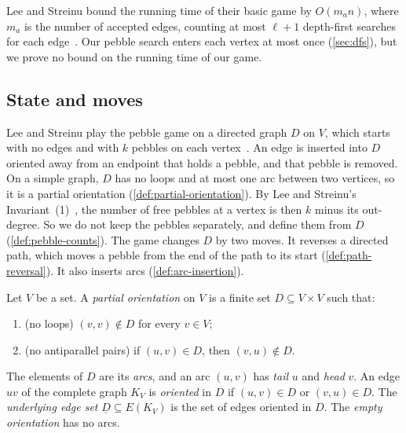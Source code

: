 Lee and Streinu bound the running time of their basic game by
$O(m_a n)$, where $m_a$ is the number of accepted edges, counting at
most $\ell + 1$ depth-first searches for each
edge~\cite[p.~1430]{leeStreinu2008}. Our pebble search enters each
vertex at most once (\cref{sec:dfs}), but we prove no bound on the
running time of our game.

\subsection{State and moves}
\label{sec:pebble-game-state}

Lee and Streinu play the pebble game on a directed graph $D$ on $V$,
which starts with no edges and with $k$ pebbles on each
vertex~\cite[\S 3]{leeStreinu2008}. An edge is inserted into $D$
oriented away from an endpoint that holds a pebble, and that pebble is
removed. On a simple graph, $D$ has no loops and at most one arc
between two vertices, so it is a partial orientation
(\cref{def:partial-orientation}). By Lee and Streinu's
Invariant~(1)~\cite[Lemma~10]{leeStreinu2008}, the number of free
pebbles at a vertex is then $k$ minus its out-degree. So we do not keep
the pebbles separately, and define them from $D$
(\cref{def:pebble-counts}). The game changes $D$ by two moves. It
reverses a directed path, which moves a pebble from the end of the
path to its start (\cref{def:path-reversal}). It also inserts arcs
(\cref{def:arc-insertion}).

\begin{definition}
  \label{def:partial-orientation}
  \leanok
  Let $V$ be a set. A \emph{partial orientation} on $V$ is a finite set
  $D \subseteq V \times V$ such that:
  \begin{enumerate}
    \item (no loops) $(v, v) \notin D$ for every $v \in V$;
    \item (no antiparallel pairs) if $(u, v) \in D$, then
      $(v, u) \notin D$.
  \end{enumerate}
  The elements of $D$ are its \emph{arcs}, and an arc $(u, v)$ has
  \emph{tail} $u$ and \emph{head} $v$. An edge $uv$ of the complete
  graph $K_V$ is \emph{oriented} in $D$ if $(u, v) \in D$ or
  $(v, u) \in D$. The \emph{underlying edge set}
  $\underline{D} \subseteq E(K_V)$ is the set of edges oriented in $D$.
  The \emph{empty orientation} has no arcs.
\end{definition}

